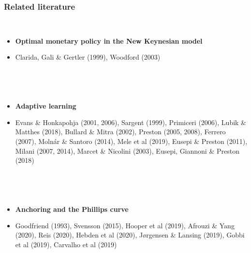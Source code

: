 \documentclass[10pt]{beamer}
\begin{document}
\begin{frame}
	\frametitle{Related literature}

\

\begin{itemize}
\item \textbf{Optimal monetary policy in the New Keynesian model}
\item[] Clarida, Gali \& Gertler (1999), Woodford (2003)

\

\

\item \textbf{Adaptive learning}
\item[] Evans \& Honkapohja (2001, 2006), Sargent (1999), Primiceri (2006), Lubik \& Matthes (2018), Bullard \& Mitra (2002), Preston (2005, 2008), Ferrero (2007), Moln\'ar \& Santoro (2014), Mele et al (2019), Eusepi \& Preston (2011), Milani (2007, 2014), Marcet \& Nicolini (2003), Eusepi, Giannoni \& Preston (2018)

\

\

\item \textbf{Anchoring and the Phillips curve} 
\item[] Goodfriend (1993), Svensson (2015), Hooper et al (2019), Afrouzi \& Yang (2020), Reis (2020), Hebden et al (2020), J{\o}rgensen \& Lansing (2019), Gobbi et al (2019), Carvalho et al (2019)

%
%
\end{itemize}


\end{frame}
\end{document}
